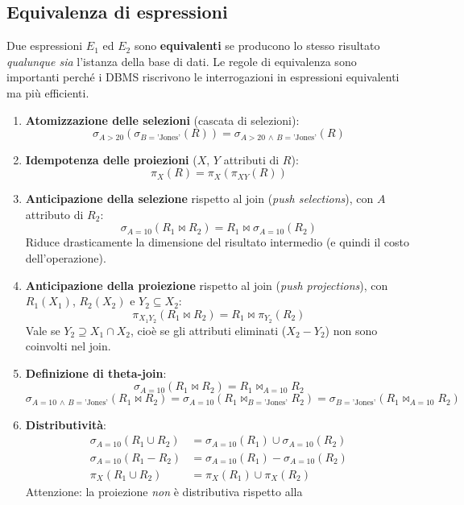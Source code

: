 \documentclass[a4paper,12pt]{article}
\begin{document}
\subsection{Equivalenza di espressioni}

Due espressioni $E_1$ ed $E_2$ sono \textbf{equivalenti} se producono lo stesso
risultato \emph{qualunque sia} l'istanza della base di dati. Le regole di
equivalenza sono importanti perché i DBMS riscrivono le interrogazioni in
espressioni equivalenti ma più efficienti.

\begin{enumerate}
  \item \textbf{Atomizzazione delle selezioni} (cascata di selezioni):
    \[ \sigma_{A > 20}(\sigma_{B = \text{'Jones'}}(R)) =
       \sigma_{A > 20 \,\wedge\, B = \text{'Jones'}}(R) \]
  \item \textbf{Idempotenza delle proiezioni} ($X$, $Y$ attributi di $R$):
    \[ \pi_X(R) = \pi_X(\pi_{XY}(R)) \]
  \item \textbf{Anticipazione della selezione} rispetto al join (\emph{push
    selections}), con $A$ attributo di $R_2$:
    \[ \sigma_{A = 10}(R_1 \bowtie R_2) = R_1 \bowtie \sigma_{A = 10}(R_2) \]
    Riduce drasticamente la dimensione del risultato intermedio (e quindi il
    costo dell'operazione).
  \item \textbf{Anticipazione della proiezione} rispetto al join (\emph{push
    projections}), con $R_1(X_1)$, $R_2(X_2)$ e $Y_2 \subseteq X_2$:
    \[ \pi_{X_1 Y_2}(R_1 \bowtie R_2) = R_1 \bowtie \pi_{Y_2}(R_2) \]
    Vale se $Y_2 \supseteq X_1 \cap X_2$, cioè se gli attributi eliminati
    ($X_2 - Y_2$) non sono coinvolti nel join.
  \item \textbf{Definizione di theta-join}:
    \[ \sigma_{A = 10}(R_1 \bowtie R_2) = R_1 \bowtie_{A = 10} R_2 \]
    \[ \sigma_{A = 10 \,\wedge\, B = \text{'Jones'}}(R_1 \bowtie R_2) =
       \sigma_{A = 10}(R_1 \bowtie_{B = \text{'Jones'}} R_2) =
       \sigma_{B = \text{'Jones'}}(R_1 \bowtie_{A = 10} R_2) \]
  \item[6--8.] \textbf{Distributività}:
    \begin{align*}
      \sigma_{A = 10}(R_1 \cup R_2) &=
        \sigma_{A = 10}(R_1) \cup \sigma_{A = 10}(R_2)\\
      \sigma_{A = 10}(R_1 - R_2) &=
        \sigma_{A = 10}(R_1) - \sigma_{A = 10}(R_2)\\
      \pi_X(R_1 \cup R_2) &= \pi_X(R_1) \cup \pi_X(R_2)
    \end{align*}
    Attenzione: la proiezione \emph{non} è distributiva rispetto alla

\end{enumerate}
\end{document}
